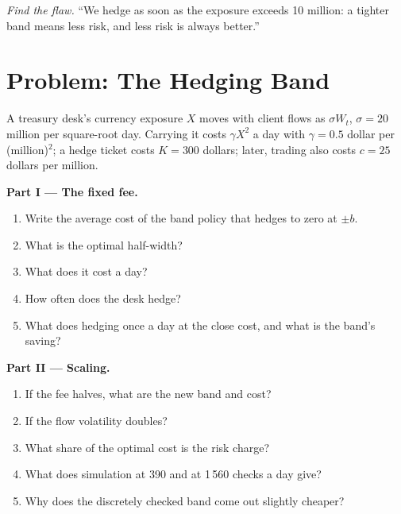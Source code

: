 \begin{exercise}[$\star\star\star$]\label{exo:qm:optimal-stopping-and-impulse-control:8}
\emph{Find the flaw.} ``We hedge as soon as the exposure exceeds 10 million: a tighter band means less risk, and less risk is
always better.''
\end{exercise}

\section{Problem: The Hedging Band}

\begin{problem}\label{pb:qm:optimal-stopping-and-impulse-control:1}
A treasury desk's currency exposure $X$ moves with client flows as $\sigma W_t$, $\sigma = 20$ million per square-root day. Carrying it costs
$\gamma X^2$ a day with $\gamma = 0.5$ dollar per (million)$^2$; a hedge ticket costs $K = 300$ dollars; later, trading also costs $c = 25$ dollars
per million.

\medskip\noindent\textbf{Part I --- The fixed fee.}
\begin{enumerate}
\item Write the average cost of the band policy that hedges to zero at $\pm b$.
\item What is the optimal half-width?
\item What does it cost a day?
\item How often does the desk hedge?
\item What does hedging once a day at the close cost, and what is the band's saving?
\end{enumerate}

\medskip\noindent\textbf{Part II --- Scaling.}
\begin{enumerate}[resume]
\item If the fee halves, what are the new band and cost?
\item If the flow volatility doubles?
\item What share of the optimal cost is the risk charge?
\item What does simulation at 390 and at 1\,560 checks a day give?
\item Why does the discretely checked band come out slightly cheaper?
\end{enumerate}


\end{problem}
